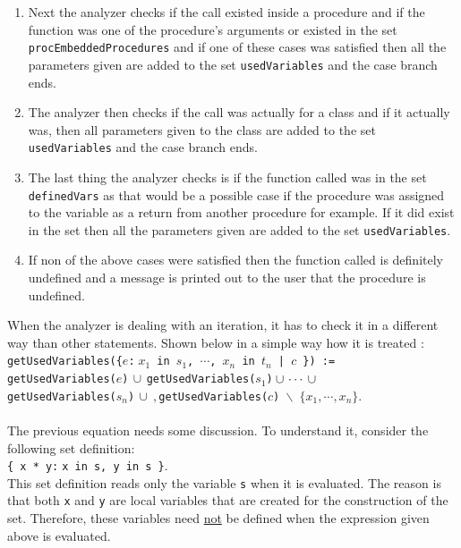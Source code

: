 \documentclass[11pt]{report}
\begin{document}
\begin{enumerate}
\item Next the analyzer checks if the call existed inside a procedure and if the function was one of the procedure's arguments or existed in the set \texttt{procEmbeddedProcedures} and if one of these cases was satisfied then all the parameters given are added to the set \texttt{usedVariables} and the case branch ends.

\item The analyzer then checks if the call was actually for a class and if it actually was, then all parameters given to the class are added to the set \texttt{usedVariables} and the case branch ends.

\item The last thing the analyzer checks is if the function called was in the set \texttt{definedVars} as that would be a possible case if the procedure was assigned to the variable as a return from another procedure for example. If it did exist in the set then all the parameters given are added to the set \texttt{usedVariables}.

\item If non of the above cases were satisfied then the function called is definitely undefined and a message is printed out to the user that the procedure is undefined.

\end{enumerate}

When the analyzer is dealing with an iteration, it has to check it in a different way than other statements. Shown below in a simple way how it is treated :
\\

\texttt{getUsedVariables(\{$e$:$\;x_1$ in $s_1$, $\cdots$, $x_n$ in $t_n$ | $c$ \}) :=} \\[0.2cm]
      \hspace*{0.8cm} 
      \texttt{getUsedVariables($e$)$\,\cup\,$getUsedVariables($s_1$)$\,\cup \,\cdots\, \cup\,
     \\ \hspace*{0.9cm} 
       $getUsedVariables($s_n$)$\,\cup\
                  ,$getUsedVariables($c$) $\backslash$ $\{x_1, \cdots, x_n \}$}.
\\
\\
      The previous equation needs some discussion.   To understand it, consider the following set definition:
      \\[0.2cm]
      \hspace*{1.3cm}
      \texttt{\{ x * y:$\;$x in s, y in s \}}.
      \\[0.2cm]
      This set definition reads only the variable \texttt{s} when it is evaluated.  The reason is that
      both \texttt{x} and \texttt{y} are local variables that are created for the construction of
      the set.  Therefore, these variables need \underline{not} be defined when the expression given
      above is evaluated.
\end{document}
